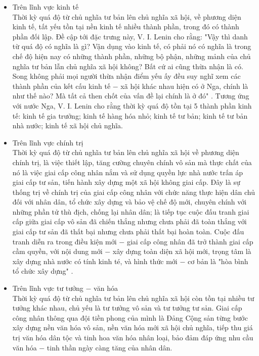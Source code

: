 \begin{itemize}
\item Trên lĩnh vực kinh tế\\
Thời kỳ quá độ từ chủ nghĩa tư bản lên chủ nghĩa xã hội, về phương diện kinh tế, tất yếu tồn tại nền kinh tế nhiều thành phần, trong đó có thành phần đối lập. Đề cập tới đặc trưng này, V. I. Lenin cho rằng: "Vậy thì danh từ quá độ có nghĩa là gì? Vận dụng vào kinh tế, có phải nó có nghĩa là trong chế độ hiện nay có những thành phần, những bộ phận, những mảnh của chủ nghĩa tư bản lẫn chủ nghĩa xã hội không? Bất cứ ai cũng thừa nhận là có. Song không phải mọi người thừa nhận điểm yếu ấy đều suy nghĩ xem các thành phần của kết cấu kinh tế $-$ xã hội khác nhau hiện có ở Nga, chính là như thế nào? Mà tất cả then chốt của vấn đề lại chính là ở đó" \supercite{Lenintt36}. Tương ứng với nước Nga, V. I. Lenin cho rằng thời kỳ quá độ tồn tại 5 thành phần kinh tế: kinh tế gia trưởng; kinh tế hàng hóa nhỏ; kinh tế tư bản; kinh tế tư bản nhà nước; kinh tế xã hội chủ nghĩa.
\item Trên lĩnh vực chính trị\\
Thời kỳ quá độ từ chủ nghĩa tư bản lên chủ nghĩa xã hội về phương diện chính trị, là việc thiết lập, tăng cường chuyên chính vô sản mà thực chất của nó là việc giai cấp công nhân nắm và sử dụng quyền lực nhà nước trấn áp giai cấp tư sản, tiến hành xây dựng một xã hội không giai cấp. Đây là sự thống trị về chính trị của giai cấp công nhân với chức năng thực hiện dân chủ đối với nhân dân, tổ chức xây dựng và bảo vệ chế độ mới, chuyên chính với những phần tử thù địch, chống lại nhân dân; là tiếp tục cuộc đấu tranh giai cấp giữa giai cấp vô sản đã chiến thắng nhưng chưa phải đã toàn thắng với giai cấp tư sản đã thất bại nhưng chưa phải thất bại hoàn toàn. Cuộc đấu tranh diễn ra trong điều kiện mới $-$ giai cấp công nhân đã trở thành giai cấp cầm quyền, với nội dung mới $-$ xây dựng toàn diện xã hội mới, trọng tâm là xây dựng nhà nước có tính kinh té, và hình thức mới $-$ cơ bản là "hòa bình tổ chức xây dựng" \supercite{giaotrinh}.
\item Trên lĩnh vực tư tưởng $-$ văn hóa\\
Thời kỳ quá độ từ chủ nghĩa tư bản lên chủ nghĩa xã hội còn tồn tại nhiều tư tưởng khác nhau, chủ yếu là tư tưởng vô sản và tư tưởng tư sản. Giai cấp công nhân thông qua đội tiền phong của mình là Đảng Cộng sản từng bước xây dựng nền văn hóa vô sản, nền văn hóa mới xã hội chủ nghĩa, tiếp thu giá trị văn hóa dân tộc và tinh hoa văn hóa nhân loại, bảo đảm đáp ứng nhu cầu văn hóa $-$ tinh thần ngày càng tăng của nhân dân.

\end{itemize}
